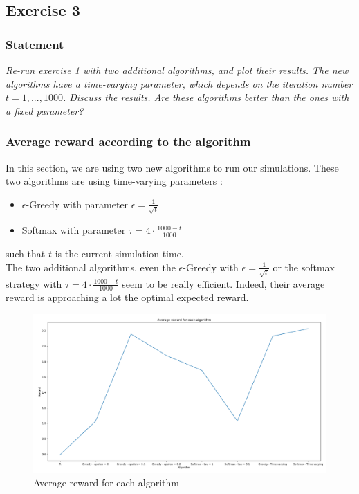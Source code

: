 \documentclass{article}
\begin{document}
\subsection{Exercise 3}

\subsubsection*{Statement}
\textit{Re-run exercise 1 with two additional algorithms, and plot their results. The new algorithms have a time-varying parameter, which depends on the iteration number $t = 1, . . . , 1000$. Discuss the results. Are these algorithms better than the ones with a fixed parameter?} 

\subsubsection{Average reward according to the algorithm}

In this section, we are using two new algorithms to run our simulations. These two algorithms are using time-varying parameters : 
\begin{itemize}
\item $\epsilon$-Greedy with parameter $\epsilon = \frac{1}{\sqrt{t}}$ 
\item Softmax with parameter $\tau = 4 \cdot \frac{1000-t}{1000}$
\end{itemize}
such that $t$ is the current simulation time. \\

The two additional algorithms, even the $\epsilon$-Greedy with $\epsilon = \frac{1}{\sqrt{t}}$ or the softmax strategy with $\tau = 4 \cdot \frac{1000-t}{1000}$ seem to be really efficient. Indeed, their average reward is approaching a lot the optimal expected reward.  

\begin{figure}[H]
  \centering
  \includegraphics[scale=0.3]{fig/bandit3-avgReward.png}
  \caption{Average reward for each algorithm}
  \label{fig:bandit3-avgReward}
\end{figure}
\end{document}
